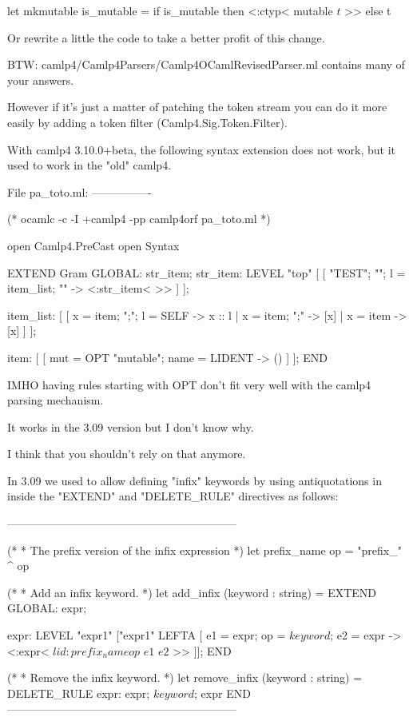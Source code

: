 let mkmutable is_mutable = if is_mutable then <:ctyp< mutable $t$ >> else t

Or rewrite a little the code to take a better profit of this change.

BTW: camlp4/Camlp4Parsers/Camlp4OCamlRevisedParser.ml contains many of
your answers.

However if it's just a matter of patching the token stream you can do
it more easily by adding a token filter (Camlp4.Sig.Token.Filter).


With camlp4 3.10.0+beta, the following syntax extension does not work, but it used to work in the "old" camlp4.

File pa_toto.ml:
----------------

(* ocamlc -c -I +camlp4 -pp camlp4orf pa_toto.ml *)

open Camlp4.PreCast
open Syntax

EXTEND Gram
  GLOBAL: str_item;
  str_item: LEVEL "top" [
    [ "TEST"; "{"; l = item_list; "}" -> <:str_item< >> ]
  ];

  item_list: [
    [ x = item; ";"; l = SELF -> x :: l
    | x = item; ";" -> [x]
    | x = item -> [x] ]
  ];

  item: [
    [ mut = OPT "mutable"; name = LIDENT -> () ]
  ];
END

IMHO having rules starting with OPT don't fit very well with the
camlp4 parsing mechanism.

It works in the 3.09 version but I don't know why.

I think that you shouldn't rely on that anymore.


In 3.09 we used to allow defining "infix" keywords by using antiquotations in inside the "EXTEND" and "DELETE_RULE" directives as follows:

--------------------------------------------------------------

(*
 * The prefix version of the infix expression
 *)
let prefix_name op =
   "prefix_" ^ op

(*
 * Add an infix keyword.
 *)
let add_infix (keyword : string) =
   EXTEND
      GLOBAL: expr;

      expr: LEVEL "expr1"
         ["expr1" LEFTA
          [ e1 = expr; op = $keyword$; e2 = expr ->
               <:expr< $lid:prefix_name op$ $e1$ $e2$ >>
          ]];
   END

(*
 * Remove the infix keyword.
 *)
let remove_infix (keyword : string) =
   DELETE_RULE
      expr:
         expr; $keyword$; expr
   END
--------------------------------------------------------------


